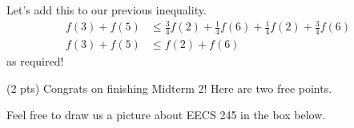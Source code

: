 \documentclass[11pt]{article}
\begin{document}
\begin{prob}
\begin{subprob}
\begin{solution}
Let's add this to our previous inequality.
\begin{align*}
f(3) + f(5) &\leq \frac{3}{4} f(2) + \frac{1}{4} f(6) + \frac{1}{4} f(2) + \frac{3}{4} f(6)
\\ f(3) + f(5) &\leq f(2) + f(6)
\end{align*}
as required!
\end{solution}
\end{subprob}

\end{prob}

\newpage

(2 pts) Congrats on finishing Midterm 2! Here are two free points.

Feel free to draw us a picture about EECS 245 in the box below. 

\emptybox{20cm}
    
\end{document}
